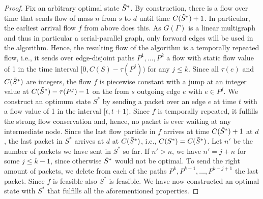 \begin{proof}
    Fix an arbitrary optimal state $\Tilde{S}^*$. By construction, there is a flow over time that sends flow of mass $n$ from $s$ to $d$ until time $C(\Tilde{S}^*)+1$. In particular, the earliest arrival flow $f$ from above does this. As $G(\Gamma)$ is a linear multigraph and thus in particular a serial-parallel graph, only forward edges will be used in the algorithm. Hence, the resulting flow of the algorithm is a temporally repeated flow, i.e., it sends over edge-disjoint paths $P^1,\ldots, P^k$ a flow with static flow value of 1 in the time interval $[0, C(S)-\tau(P^j))$ for any $j\leq k$. Since all $\tau(e)$ and $C(\Tilde{S}^*)$ are integers, the flow $f$ is piecewise constant with a jump at an integer value at $C(\Tilde{S}^*)-\tau(P^j)-1$ on the from $s$ outgoing edge $e$ with $e\in P^j$.
    We construct an optimum state $S^*$ by sending a packet over an edge $e$ at time $t$ with a flow value of 1 in the interval $[t,t+1)$. Since $f$ is temporally repeated, it fulfills the strong flow conservation and, hence, no packet is ever waiting at any intermediate node. Since the last flow particle in $f$ arrives at time $C(\Tilde{S}^*)+1$ at $d$, the last packet in $S^*$ arrives at $d$ at $C(\Tilde{S}^*)$, i.e., $C(S^*) = C(\Tilde{S}^*)$. Let $n'$ be the number of packets we have sent in $S^*$ so far. If $n'> n$, we have $n' = j + n$ for some $j\leq k-1$, since otherwise $\Tilde{S}^*$ would not be optimal. To send the right amount of packets, we delete from each of the paths $P^k,P^{k-1},\ldots, P^{k-j+1}$ the last packet. Since $f$ is feasible also $S^*$ is feasible. We have now constructed an optimal state with $S^*$ that fulfills all the aforementioned properties.
\end{proof} 
\fi



















